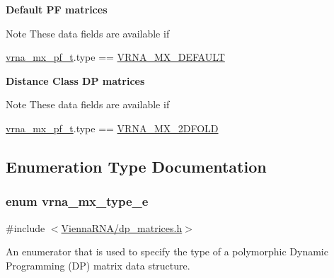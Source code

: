 \begin{Indent}{\bf Default PF matrices}\par
{\em \begin{DoxyNote}{Note}
These data fields are available if 
\begin{DoxyCode}
\hyperlink{group__dp__matrices_structvrna__mx__pf__s}{vrna\_mx\_pf\_t}.type == \hyperlink{group__dp__matrices_gga6042ea1d58d01931e959791be6d89343aafa2568956dab79595521e20c49a5f75}{VRNA\_MX\_DEFAULT} 
\end{DoxyCode}
 
\end{DoxyNote}
}\end{Indent}
\begin{Indent}{\bf Distance Class DP matrices}\par
{\em \begin{DoxyNote}{Note}
These data fields are available if 
\begin{DoxyCode}
\hyperlink{group__dp__matrices_structvrna__mx__pf__s}{vrna\_mx\_pf\_t}.type == \hyperlink{group__dp__matrices_gga6042ea1d58d01931e959791be6d89343ae656f8391445ff71bed8a597a0a19417}{VRNA\_MX\_2DFOLD} 
\end{DoxyCode}
 
\end{DoxyNote}
}\end{Indent}


\subsection{Enumeration Type Documentation}
\subsubsection[{\texorpdfstring{vrna\+\_\+mx\+\_\+type\+\_\+e}{vrna_mx_type_e}}]{\setlength{\rightskip}{0pt plus 5cm}enum {\bf vrna\+\_\+mx\+\_\+type\+\_\+e}}\hypertarget{group__dp__matrices_ga6042ea1d58d01931e959791be6d89343}{}\label{group__dp__matrices_ga6042ea1d58d01931e959791be6d89343}


{\ttfamily \#include $<$\hyperlink{dp__matrices_8h}{Vienna\+R\+N\+A/dp\+\_\+matrices.\+h}$>$}



An enumerator that is used to specify the type of a polymorphic Dynamic Programming (DP) matrix data structure. 

